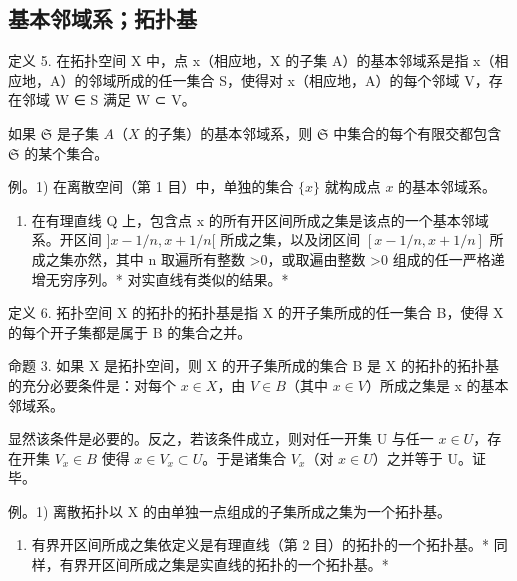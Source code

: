 \subsection{基本邻域系；拓扑基}

定义 5. 在拓扑空间 X 中，点 x（相应地，X 的子集 A）的基本邻域系是指 x（相应地，A）的邻域所成的任一集合 S，使得对 x（相应地，A）的每个邻域 V，存在邻域 W ∈ S 满足 W ⊂ V。

如果 \(\mathfrak{S}\) 是子集 \(A\)（\(X\) 的子集）的基本邻域系，则 \(\mathfrak{S}\) 中集合的每个有限交都包含 \(\mathfrak{S}\) 的某个集合。

例。1) 在离散空间（第 1 目）中，单独的集合 \(\{x\}\) 就构成点 \(x\) 的基本邻域系。

\begin{enumerate}
\def\labelenumi{\arabic{enumi})}
\setcounter{enumi}{1}
\tightlist
\item
  在有理直线 Q 上，包含点 x 的所有开区间所成之集是该点的一个基本邻域系。开区间 \(]x - 1/n, x + 1/n[\) 所成之集，以及闭区间 \([x - 1/n, x + 1/n]\) 所成之集亦然，其中 n 取遍所有整数 \textgreater0，或取遍由整数 \textgreater0 组成的任一严格递增无穷序列。* 对实直线有类似的结果。*
\end{enumerate}

定义 6. 拓扑空间 X 的拓扑的拓扑基是指 X 的开子集所成的任一集合 B，使得 X 的每个开子集都是属于 B 的集合之并。

命题 3. 如果 X 是拓扑空间，则 X 的开子集所成的集合 B 是 X 的拓扑的拓扑基的充分必要条件是：对每个 \(x \in X\)，由 \(V \in B\)（其中 \(x \in V\)）所成之集是 x 的基本邻域系。

显然该条件是必要的。反之，若该条件成立，则对任一开集 U 与任一 \(x \in U\)，存在开集 \(V_{x} \in B\) 使得 \(x \in V_{x} \subset U\)。于是诸集合 \(V_{x}\)（对 \(x \in U\)）之并等于 U。证毕。

例。1) 离散拓扑以 X 的由单独一点组成的子集所成之集为一个拓扑基。

\begin{enumerate}
\def\labelenumi{\arabic{enumi})}
\setcounter{enumi}{1}
\tightlist
\item
  有界开区间所成之集依定义是有理直线（第 2 目）的拓扑的一个拓扑基。* 同样，有界开区间所成之集是实直线的拓扑的一个拓扑基。*
\end{enumerate}

